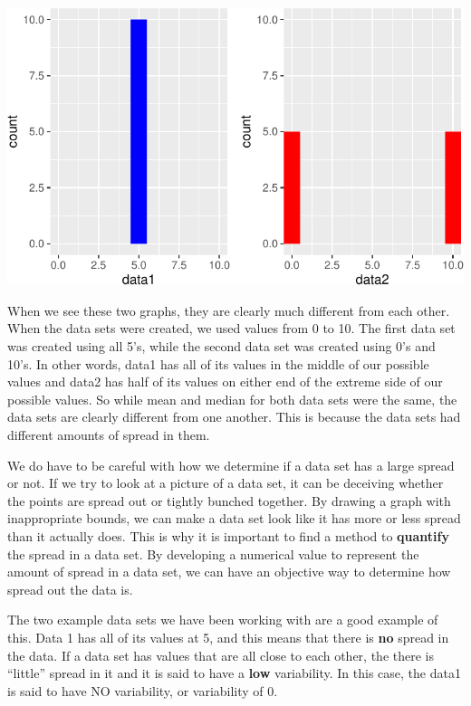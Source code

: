 \documentclass[
  letterpaper,
  DIV=11,
  numbers=noendperiod]{scrreprt}
\begin{document}
\includegraphics{Measures_of_Variability_files/figure-pdf/unnamed-chunk-4-1.pdf}

When we see these two graphs, they are clearly much different from each
other. When the data sets were created, we used values from 0 to 10. The
first data set was created using all 5's, while the second data set was
created using 0's and 10's. In other words, data1 has all of its values
in the middle of our possible values and data2 has half of its values on
either end of the extreme side of our possible values. So while mean and
median for both data sets were the same, the data sets are clearly
different from one another. This is because the data sets had different
amounts of spread in them.

We do have to be careful with how we determine if a data set has a large
spread or not. If we try to look at a picture of a data set, it can be
deceiving whether the points are spread out or tightly bunched together.
By drawing a graph with inappropriate bounds, we can make a data set
look like it has more or less spread than it actually does. This is why
it is important to find a method to \textbf{quantify} the spread in a
data set. By developing a numerical value to represent the amount of
spread in a data set, we can have an objective way to determine how
spread out the data is.

The two example data sets we have been working with are a good example
of this. Data 1 has all of its values at 5, and this means that there is
\textbf{no} spread in the data. If a data set has values that are all
close to each other, the there is ``little'' spread in it and it is said
to have a \textbf{low} variability. In this case, the data1 is said to
have NO variability, or variability of 0.
\end{document}
